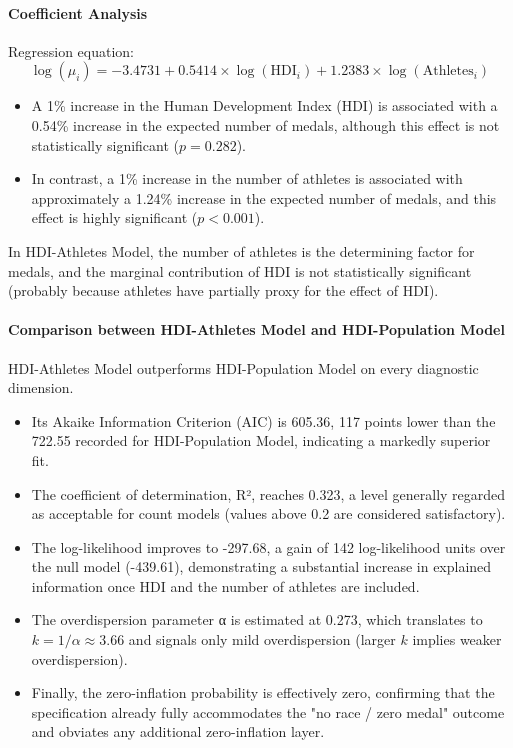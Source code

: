 \documentclass[11pt,twoside]{article}
\numberwithin{Theorem}{section}
\numberwithin{Definition}{section}
\numberwithin{Lemma}{section}
\numberwithin{Algorithm}{section}
\numberwithin{equation}{section}
\begin{document}
\paragraph{Coefficient Analysis}
Regression equation: 
\[
\log(\mu_i) = -3.4731 + 0.5414 \times \log(\text{HDI}_i) + 1.2383 \times \log(\text{Athletes}_i)
\]

\begin{itemize}
    \item A 1\% increase in the Human Development Index (HDI) is associated with a 0.54\% increase in the expected number of medals, although this effect is not statistically significant ($p = 0.282$). 
    \item In contrast, a 1\% increase in the number of athletes is associated with approximately a 1.24\% increase in the expected number of medals, and this effect is highly significant ($p < 0.001$).
\end{itemize}

In HDI-Athletes Model, the number of athletes is the determining factor for medals, and the marginal contribution of HDI is not statistically significant (probably because athletes have partially proxy for the effect of HDI).

\paragraph{Comparison between HDI-Athletes Model and HDI-Population Model}
HDI-Athletes Model outperforms HDI-Population Model on every diagnostic dimension.

\begin{itemize}
    \item Its Akaike Information Criterion (AIC) is 605.36, 117 points lower than the 722.55 recorded for HDI-Population Model, indicating a markedly superior fit.
    \item The coefficient of determination, R², reaches 0.323, a level generally regarded as acceptable for count models (values above 0.2 are considered satisfactory).
    \item The log-likelihood improves to -297.68, a gain of 142 log-likelihood units over the null model (-439.61), demonstrating a substantial increase in explained information once HDI and the number of athletes are included.
    \item The overdispersion parameter α is estimated at 0.273, which translates to $k = 1/\alpha \approx 3.66$ and signals only mild overdispersion (larger $k$ implies weaker overdispersion).
    \item Finally, the zero-inflation probability is effectively zero, confirming that the specification already fully accommodates the "no race / zero medal" outcome and obviates any additional zero-inflation layer.
\end{itemize}
\end{document}

